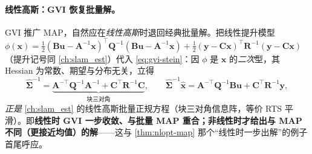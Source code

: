 \paragraph{线性高斯：GVI 恢复批量解。}
GVI 推广 MAP，自然应在\emph{线性高斯}时退回经典批量解。把线性提升模型 $\phi(\mathbf{x})=\tfrac12(\mathbf{B}\mathbf{u}-\mathbf{A}^{-1}\mathbf{x})^\top\mathbf{Q}^{-1}(\mathbf{B}\mathbf{u}-\mathbf{A}^{-1}\mathbf{x})+\tfrac12(\mathbf{y}-\mathbf{C}\mathbf{x})^\top\mathbf{R}^{-1}(\mathbf{y}-\mathbf{C}\mathbf{x})$（提升记号同 \cref{ch:slam_est}）代入 \cref{eq:gvi-stein}：因 $\phi$ 是 $\mathbf{x}$ 的\emph{二次}型，其 Hessian 为常数、期望与分布无关，立得
\begin{equation}
  \hat{\boldsymbol{\Sigma}}^{-1}=\underbrace{\mathbf{A}^{-\top}\mathbf{Q}^{-1}\mathbf{A}^{-1}+\mathbf{C}^\top\mathbf{R}^{-1}\mathbf{C}}_{\text{块三对角}},\qquad
  \hat{\boldsymbol{\Sigma}}^{-1}\hat{\mathbf{x}}=\mathbf{A}^{-\top}\mathbf{Q}^{-1}\mathbf{B}\mathbf{u}+\mathbf{C}^\top\mathbf{R}^{-1}\mathbf{y},
  \label{eq:gvi-linear}
\end{equation}
\emph{正是} \cref{ch:slam_est} 的线性高斯批量正规方程（块三对角信息阵，等价 RTS 平滑）。即\textbf{线性时 GVI 一步收敛、与批量 MAP 重合；非线性时才给出与 MAP 不同（更接近均值）的解}——这与 \cref{thm:nlopt-map} 那个“线性时一步出解”的例子首尾呼应。

